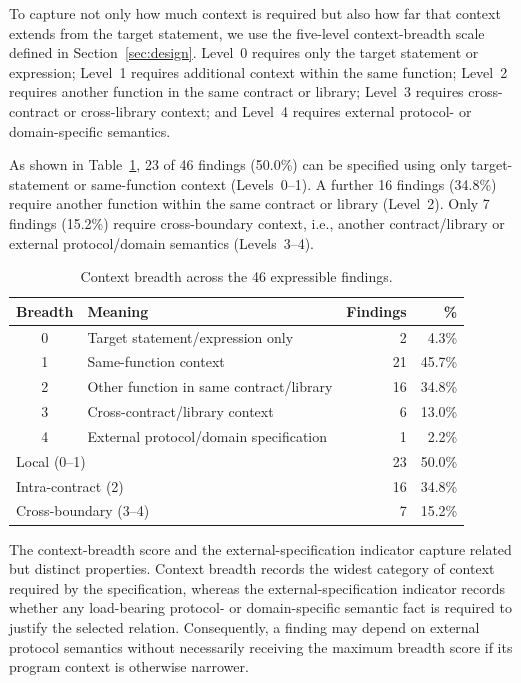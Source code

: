 \documentclass[pdflatex,sn-basic]{sn-jnl}%
\theoremstyle{thmstyleone}%
\theoremstyle{thmstyletwo}%
\theoremstyle{thmstylethree}%
\begin{document}
To capture not only how much context is required but also how far that context
extends from the target statement, we use the five-level context-breadth scale
defined in Section~\ref{sec:design}. Level~0 requires only the target
statement or expression; Level~1 requires additional context within the same
function; Level~2 requires another function in the same contract or library;
Level~3 requires cross-contract or cross-library context; and Level~4 requires
external protocol- or domain-specific semantics.

As shown in Table~\ref{tab:rq2-breadth}, 23 of 46 findings (50.0\%) can be
specified using only target-statement or same-function context (Levels~0--1).
A further 16 findings (34.8\%) require another function within the same
contract or library (Level~2). Only 7 findings (15.2\%) require
cross-boundary context, i.e., another contract/library or external
protocol/domain semantics (Levels~3--4).

\begin{table}[t]
\centering
\caption{Context breadth across the 46 expressible findings.}
\label{tab:rq2-breadth}
\small
\begin{tabular}{c p{5.2cm} rr}
\toprule
\textbf{Breadth} & \textbf{Meaning} & \textbf{Findings} & \textbf{\%} \\
\midrule
0 & Target statement/expression only      &  2 &  4.3\% \\
1 & Same-function context                 & 21 & 45.7\% \\
2 & Other function in same contract/library & 16 & 34.8\% \\
3 & Cross-contract/library context        &  6 & 13.0\% \\
4 & External protocol/domain specification &  1 &  2.2\% \\
\midrule
\multicolumn{2}{l}{Local (0--1)}          & 23 & 50.0\% \\
\multicolumn{2}{l}{Intra-contract (2)}    & 16 & 34.8\% \\
\multicolumn{2}{l}{Cross-boundary (3--4)} &  7 & 15.2\% \\
\bottomrule
\end{tabular}
\end{table}

The context-breadth score and the external-specification indicator capture
related but distinct properties. Context breadth records the widest category of
context required by the specification, whereas the external-specification
indicator records whether any load-bearing protocol- or domain-specific semantic
fact is required to justify the selected relation. Consequently, a finding may
depend on external protocol semantics without necessarily receiving the maximum
breadth score if its program context is otherwise narrower.
\end{document}
